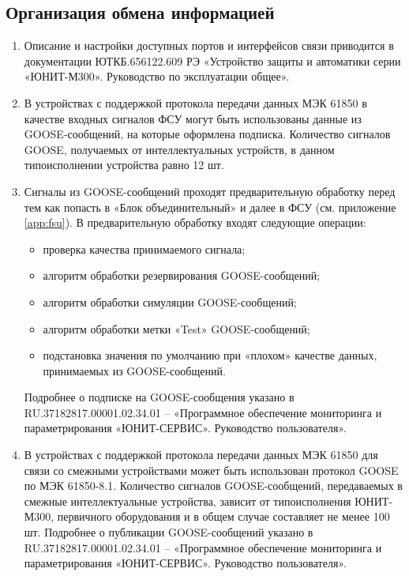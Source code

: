 \color{unidarkgreen}\subsection{Организация обмена информацией}\color{black}

\begin{enumerate}[label=\arabic{section}.\arabic{subsection}.\arabic*, labelsep=4pt, leftmargin=0pt, itemindent=57pt]

\item\sloppy Описание и настройки доступных портов и интерфейсов связи приводится в документации ЮТКБ.656122.609 РЭ «Устройство защиты и автоматики серии «ЮНИТ-М300». Руководство по эксплуатации общее».

\item
В устройствах с поддержкой протокола передачи данных МЭК 61850 в качестве входных сигналов ФСУ могут быть использованы данные из GOOSE-сообщений, на которые оформлена подписка. Количество сигналов GOOSE, получаемых от интеллектуальных устройств, в данном типоисполнении устройства равно 12 шт.
\item
Сигналы из GOOSE-сообщений проходят предварительную обработку перед тем как попасть в «Блок объединительный» и далее в ФСУ (см. приложение \ref{app:fsu}).
В предварительную обработку входят следующие операции:
\begin{itemize}
\item проверка качества принимаемого сигнала;
\item алгоритм обработки резервирования GOOSE-сообщений;
\item алгоритм обработки симуляции GOOSE-сообщений;
\item алгоритм обработки метки «Test» GOOSE-сообщений;
\item подстановка значения по умолчанию при «плохом» качестве данных, принимаемых из GOOSE-сообщений.
\end{itemize}
Подробнее о подписке на GOOSE-сообщения указано в RU.37182817.00001.02.34.01 – «Программное обеспечение мониторинга и параметрирования «ЮНИТ-СЕРВИС». Руководство пользователя».

\item 
В устройствах с поддержкой протокола передачи данных МЭК 61850 для связи со смежными устройствами может быть использован протокол GOOSE по МЭК 61850-8.1. Количество сигналов GOOSE-сообщений, передаваемых в смежные интеллектуальные устройства, зависит от типоисполнения ЮНИТ-М300, первичного оборудования и в общем случае составляет не менее 100 шт. Подробнее о публикации GOOSE-сообщений указано в RU.37182817.00001.02.34.01 – «Программное обеспечение мониторинга и параметрирования «ЮНИТ-СЕРВИС». Руководство пользователя».

\end{enumerate}

